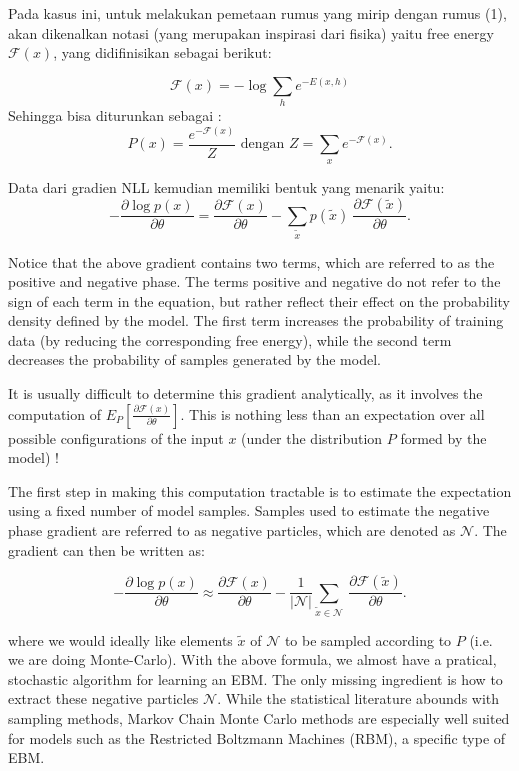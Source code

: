 \documentclass[12pt]{article}
\begin{document}
Pada kasus ini, untuk melakukan pemetaan rumus yang mirip dengan rumus (1), akan dikenalkan notasi (yang merupakan inspirasi dari fisika) yaitu free energy $\mathcal{F}(x)$, yang didifinisikan sebagai berikut:

\begin{equation}
\mathcal{F}(x) = - \log \sum_h e^{-E(x,h)}
\end{equation}
Sehingga bisa diturunkan sebagai :
\[P(x) = \frac{e^{-\mathcal{F}(x)}}{Z} \text{ dengan } Z=\sum_x e^{-\mathcal{F}(x)}.\]

Data dari gradien NLL kemudian memiliki bentuk yang menarik yaitu:
\begin{equation}
- \frac{\partial  \log p(x)}{\partial \theta}
 = \frac{\partial \mathcal{F}(x)}{\partial \theta} -
       \sum_{\tilde{x}} p(\tilde{x}) \
           \frac{\partial \mathcal{F}(\tilde{x})}{\partial \theta}.
\end{equation}

Notice that the above gradient contains two terms, which are referred to as the positive and negative phase. The terms positive and negative do not refer to the sign of each term in the equation, but rather reflect their effect on the probability density defined by the model. The first term increases the probability of training data (by reducing the corresponding free energy), while the second term decreases the probability of samples generated by the model.

It is usually difficult to determine this gradient analytically, as it involves the computation of $E_P [ \frac{\partial \mathcal{F}(x)} {\partial \theta} ]$. This is nothing less than an expectation over all possible configurations of the input $x$ (under the distribution $P$ formed by the model) !

The first step in making this computation tractable is to estimate the expectation using a fixed number of model samples. Samples used to estimate the negative phase gradient are referred to as negative particles, which are denoted as $\mathcal{N}$. The gradient can then be written as:

\begin{equation}
- \frac{\partial \log p(x)}{\partial \theta}
 \approx
  \frac{\partial \mathcal{F}(x)}{\partial \theta} -
   \frac{1}{|\mathcal{N}|}\sum_{\tilde{x} \in \mathcal{N}} \
   \frac{\partial \mathcal{F}(\tilde{x})}{\partial \theta}.
\end{equation}

where we would ideally like elements $\tilde{x}$ of $\mathcal{N}$ to be sampled according to $P$ (i.e. we are doing Monte-Carlo). With the above formula, we almost have a pratical, stochastic algorithm for learning an EBM. The only missing ingredient is how to extract these negative particles $\mathcal{N}$. While the statistical literature abounds with sampling methods, Markov Chain Monte Carlo methods are especially well suited for models such as the Restricted Boltzmann Machines (RBM), a specific type of EBM.
\end{document}
